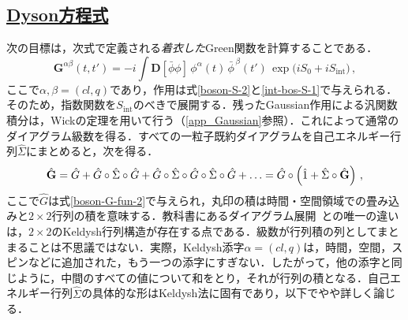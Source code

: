 \documentclass[a4paper,11pt]{ltjsarticle}
\newcommand{\subsectionlink}[1]{\subsection[#1]{\hyperlink{toc}{#1}}}
\def\D{\mathbf{D}}
\begin{document}
\subsectionlink{Dyson方程式}\label{sec_int_bos-3}


次の目標は，次式で定義される\emph{着衣した}Green関数を計算することである．
\begin{equation}\label{int-bos-G-dressed}
\mathbf{G}^{\alpha\beta}(t,t')=-i\int\D[\bar{\phi}\phi]
\,\phi^\alpha(t)\,\bar{\phi}^{\,\beta}(t')\,
\exp\big(iS_0+iS_{\mathrm{int}}\big)\, ,
\end{equation}ここで$\alpha,\beta=(cl,q)$であり，作用は式\eqref{boson-S-2}と\eqref{int-bos-S-1}で与えられる．そのため，指数関数を$S_{\mathrm{int}}$のべきで展開する．残ったGaussian作用による汎関数積分は，Wickの定理を用いて行う（\ref{app_Gaussian}参照）．これによって通常のダイアグラム級数を得る．すべての一粒子既約ダイアグラムを自己エネルギー行列$\hat{\Sigma}$にまとめると，次を得る．
\begin{equation}\label{int-bos-G-expansion}
\hat{{\bf G}}=\hat{G}+\hat{G}\circ\hat{\Sigma}\circ
\hat{G}+\hat{G}\circ\hat{\Sigma}\circ \hat{G}\circ\hat{\Sigma}\circ
\hat{G} +\ldots= \hat{G}\circ\left(\hat 1+\hat{\Sigma}\circ\hat{{\bf
G}}\right) \, ,
\end{equation}ここで$\hat G$は式\eqref{boson-G-fun-2}で与えられ，丸印の積は時間・空間領域での畳み込みと$2\times 2$行列の積を意味する．教科書にあるダイアグラム展開~\cite{Mahan,AGD,NegeleOrland}との唯一の違いは，$2\times 2$のKeldysh行列構造が存在する点である．級数が行列積の列としてまとまることは不思議ではない．実際，Keldysh添字$\alpha=(cl,q)$は，時間，空間，スピンなどに追加された，もう一つの添字にすぎない．したがって，他の添字と同じように，中間のすべての値について和をとり，それが行列の積となる．自己エネルギー行列$\hat{\Sigma}$の具体的な形はKeldysh法に固有であり，以下でやや詳しく論じる．
\end{document}
